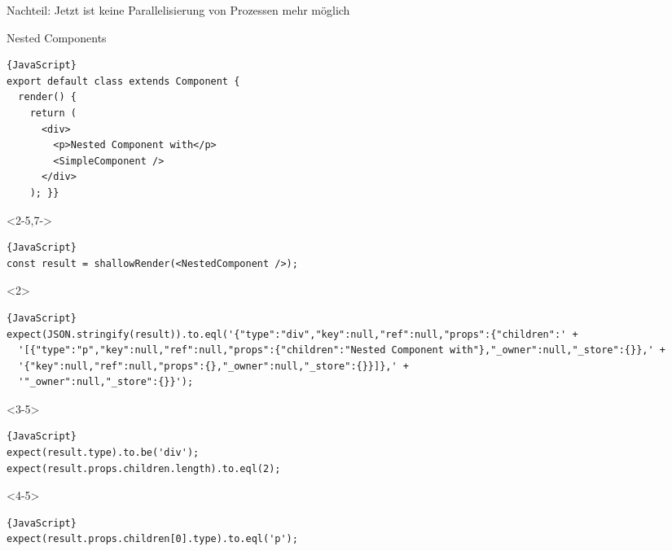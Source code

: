 \begin{frame}[fragile]{}

Nachteil: Jetzt ist keine Parallelisierung von Prozessen mehr möglich

\end{frame}


\begin{frame}[fragile]{Nested Components}

\vspace{-2em}
\begin{lstlisting}{JavaScript}
export default class extends Component {
  render() {
    return (
      <div>
        <p>Nested Component with</p>
        <SimpleComponent />
      </div>
    ); }}
\end{lstlisting}

\vspace{-0.5em}

\begin{overlayarea}{\linewidth}{3cm}

\begin{onlyenv}<2-5,7->
\begin{lstlisting}{JavaScript}
const result = shallowRender(<NestedComponent />);
\end{lstlisting}
\end{onlyenv}

\begin{onlyenv}<2>
\vspace{-0.5em}
\begin{lstlisting}{JavaScript}
expect(JSON.stringify(result)).to.eql('{"type":"div","key":null,"ref":null,"props":{"children":' +
  '[{"type":"p","key":null,"ref":null,"props":{"children":"Nested Component with"},"_owner":null,"_store":{}},' +
  '{"key":null,"ref":null,"props":{},"_owner":null,"_store":{}}]},' +
  '"_owner":null,"_store":{}}');
\end{lstlisting}
\end{onlyenv}

\begin{onlyenv}<3-5>
\vspace{-0.5em}
\begin{lstlisting}{JavaScript}
expect(result.type).to.be('div');
expect(result.props.children.length).to.eql(2);
\end{lstlisting}
\end{onlyenv}

\begin{onlyenv}<4-5>
\vspace{-0.5em}
\begin{lstlisting}{JavaScript}
expect(result.props.children[0].type).to.eql('p');
\end{lstlisting}
\end{onlyenv}


\end{overlayarea}
\end{frame}
